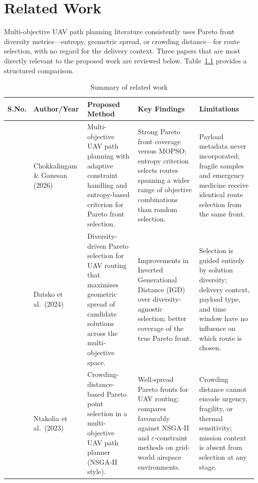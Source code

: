 \documentclass{ssnreview}
\begin{document}
\chapter{Related Work}

Multi-objective UAV path planning literature consistently uses Pareto front diversity
metrics---entropy, geometric spread, or crowding distance---for route selection, with no
regard for the delivery context. Three papers that are most directly relevant to the
proposed work are reviewed below. Table~\ref{tab:related-work} provides a structured
comparison.

\begin{table}[H]
\centering\caption{Summary of related work}\label{tab:related-work}\small
\begin{tabularx}{\textwidth}{>{\centering\arraybackslash}p{0.65cm} p{2.9cm} X X X}
\toprule
\textbf{S.No.} & \textbf{Author/Year} & \textbf{Proposed Method} & \textbf{Key Findings} & \textbf{Limitations}\\
\midrule
1 & Chokkalingam \& Ganesan (2026) \cite{r1} &
Multi-objective UAV path planning with adaptive constraint handling and entropy-based
criterion for Pareto front selection. &
Strong Pareto front coverage versus MOPSO; entropy criterion selects routes spanning a
wider range of objective combinations than random selection. &
Payload metadata never incorporated; fragile samples and emergency medicine receive
identical route selection from the same front.\\[4pt]
2 & Datsko et al.\ (2024) \cite{r2} &
Diversity-driven Pareto selection for UAV routing that maximises geometric spread of
candidate solutions across the multi-objective space. &
Improvements in Inverted Generational Distance (IGD) over diversity-agnostic selection;
better coverage of the true Pareto front. &
Selection is guided entirely by solution diversity; delivery context, payload type, and
time window have no influence on which route is chosen.\\[4pt]
3 & Ntakolia et al.\ (2023) \cite{r3} &
Crowding-distance-based Pareto point selection in a multi-objective UAV path planner
(NSGA-II style). &
Well-spread Pareto fronts for UAV routing; compares favourably against NSGA-II and
$\varepsilon$-constraint methods on grid-world airspace environments. &
Crowding distance cannot encode urgency, fragility, or thermal sensitivity; mission
context is absent from selection at any stage.\\
\bottomrule
\end{tabularx}
\end{table}
\end{document}
